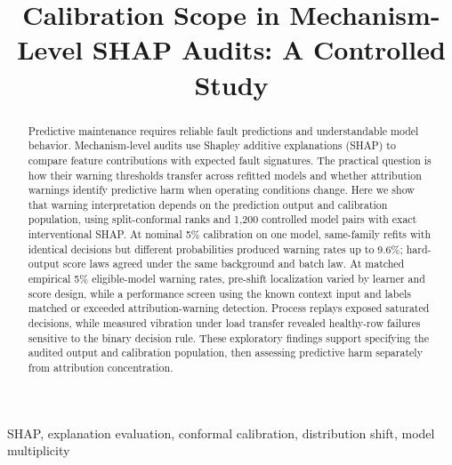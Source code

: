 \documentclass[conference]{IEEEtran}
\begin{document}
\title{Calibration Scope in Mechanism-Level SHAP Audits: A Controlled Study}
\author{
}
\maketitle
\begin{abstract}
Predictive maintenance requires reliable fault predictions and understandable model behavior. Mechanism-level audits use Shapley additive explanations (SHAP) to compare feature contributions with expected fault signatures. The practical question is how their warning thresholds transfer across refitted models and whether attribution warnings identify predictive harm when operating conditions change. Here we show that warning interpretation depends on the prediction output and calibration population, using split-conformal ranks and 1,200 controlled model pairs with exact interventional SHAP. At nominal 5\% calibration on one model, same-family refits with identical decisions but different probabilities produced warning rates up to 9.6\%; hard-output score laws agreed under the same background and batch law. At matched empirical 5\% eligible-model warning rates, pre-shift localization varied by learner and score design, while a performance screen using the known context input and labels matched or exceeded attribution-warning detection. Process replays exposed saturated decisions, while measured vibration under load transfer revealed healthy-row failures sensitive to the binary decision rule. These exploratory findings support specifying the audited output and calibration population, then assessing predictive harm separately from attribution concentration.
\end{abstract}
\begin{IEEEkeywords}
SHAP, explanation evaluation, conformal calibration, distribution shift, model multiplicity
\end{IEEEkeywords}
\end{document}
